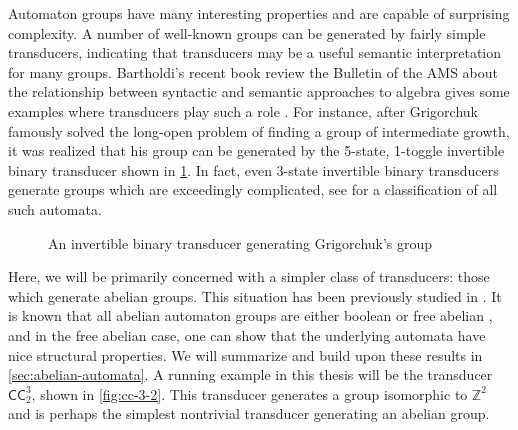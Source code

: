 \documentclass[12pt, letterpaper]{article}
\newcommand{\Z}{\mathbb Z}
\newcommand{\CC}{\mathsf{CC}}
\begin{document}
Automaton groups have many interesting properties and are capable of surprising
complexity. A number of well-known groups can be generated by fairly simple
transducers, indicating that transducers may be a useful semantic
interpretation for many groups. Bartholdi's recent book review the Bulletin of
the AMS about the relationship between syntactic and semantic approaches
to algebra gives some examples where transducers play such a role
\cite{Bartholdi17:syntax_semantic_review}.  For instance, after Grigorchuk
famously solved the long-open problem of finding a group of intermediate
growth, it was realized that his group can be generated by the 5-state,
1-toggle invertible binary transducer shown in \cref{fig:grigorchuk}.  In fact,
even 3-state invertible binary transducers generate groups which are
exceedingly complicated, see \cite{2008arXiv0803.3555B} for a classification of
all such automata.
\begin{figure}[h]
    \centering
    \caption{An invertible binary transducer generating Grigorchuk's group}
    \label{fig:grigorchuk}
\end{figure}

Here, we will be primarily concerned with a simpler class of transducers: those
which generate abelian groups. This situation has been previously studied in
\cite{Okano-Thesis, Sutner18:abelian_automata}. It is known that all abelian
automaton groups are either boolean or free abelian \cite{Okano-Thesis}, and in
the free abelian case, one can show that the underlying automata have nice
structural properties. We will summarize and build upon these results in
\cref{sec:abelian-automata}.  A running example in this thesis will be the
transducer $\CC^3_2$, shown in \cref{fig:cc-3-2}. This transducer generates a
group isomorphic to $\Z^2$ and is perhaps the simplest nontrivial transducer
generating an abelian group.
\end{document}
